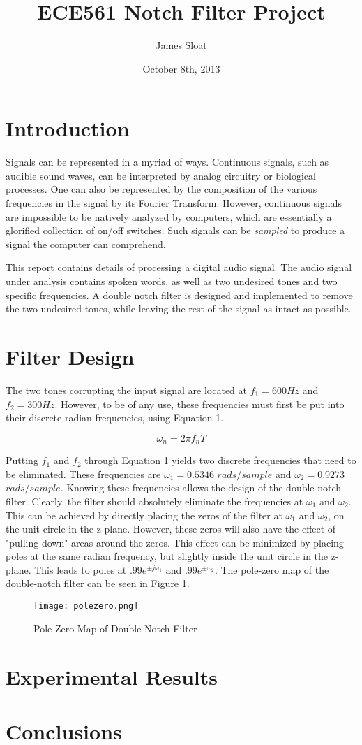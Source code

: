 \documentclass[12pt, titlepage]{article}
\author{James Sloat}
\title{ECE561 Notch Filter Project}
\date{October 8th, 2013}
\begin{document}
\maketitle

\section{Introduction}

Signals can be represented in a myriad of ways. Continuous signals, such as audible sound waves, can be interpreted by analog circuitry or biological processes. One can also be represented by the composition of the various frequencies in the signal by its Fourier Transform. However, continuous signals are impossible to be natively analyzed by computers, which are essentially a glorified collection of on/off switches. Such signals can be \textit{sampled} to produce a signal the computer can comprehend.

This report contains details of processing a digital audio signal. The audio signal under analysis contains spoken words, as well as two undesired tones and two specific frequencies. A double notch filter is designed and implemented to remove the two undesired tones, while leaving the rest of the signal as intact as possible.

\section{Filter Design}

The two tones corrupting the input signal are located at $f_1 = 600Hz$ and $f_2 = 300Hz$. However, to be of any use, these frequencies must first be put into their discrete radian frequencies, using Equation 1.

\begin{equation}
\omega_n = 2\pi f_nT
\end{equation}

Putting $f_1$ and $f_2$ through Equation 1 yields two discrete frequencies that need to be eliminated. These frequencies are $\omega_1 = 0.5346$ $rads/sample$ and $\omega_2 = 0.9273$  $rads/sample$. Knowing these frequencies allows the design of the double-notch filter. Clearly, the filter should absolutely eliminate the frequencies at $\omega_1$ and $\omega_2$. This can be achieved by directly placing the zeros of the filter at $\omega_1$ and $\omega_2$, on the unit circle in the z-plane. However, these zeros will also have the effect of "pulling down" areas around the zeros. This effect can be minimized by placing poles at the same radian frequency, but slightly inside the unit circle in the z-plane. This leads to poles at $.99e^{\pm j\omega_1}$ and $.99e^{\pm \omega_2}$. The pole-zero map of the double-notch filter can be seen in Figure 1.

\begin{figure}[h]
\centering
\texttt{[image: polezero.png]}
\caption{Pole-Zero Map of Double-Notch Filter}
\end{figure}

\section{Experimental Results}

\section{Conclusions}
\end{document}
